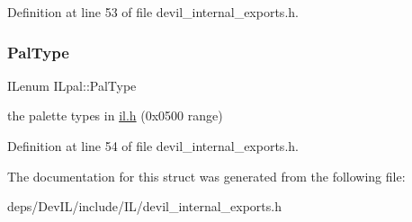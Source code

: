 Definition at line 53 of file devil\+\_\+internal\+\_\+exports.\+h.

\mbox{\label{structILpal_a586f4c7d59e6f202e1d63c67f7679c23}} 
\subsubsection{\texorpdfstring{Pal\+Type}{PalType}}
{\footnotesize\ttfamily I\+Lenum I\+Lpal\+::\+Pal\+Type}



the palette types in \hyperlink{il_8h}{il.\+h} (0x0500 range) 



Definition at line 54 of file devil\+\_\+internal\+\_\+exports.\+h.



The documentation for this struct was generated from the following file\+:\begin{DoxyCompactItemize}
\item 
deps/\+Dev\+I\+L/include/\+I\+L/devil\+\_\+internal\+\_\+exports.\+h\end{DoxyCompactItemize}
